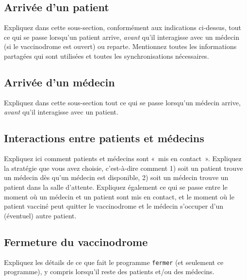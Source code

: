 \documentclass[a4paper]{article}
\makeatletter
\newenvironment{expl}{%
  \begin{list}{}{%
      \small\itshape%
      \topsep\z@%
      \listparindent0pt%
      \parsep0.75\baselineskip%
      \setlength{\leftmargin}{20mm}%
      \setlength{\rightmargin}{20mm}%
    }
  \item[]}%
  {\end{list}}
\makeatother
\begin{document}
\subsection{Arrivée d'un patient}\label{arrivee-patient}

\begin{expl}
  Expliquez dans cette sous-section, conformément aux indications
  ci-dessus, tout ce qui se passe lorsqu'un patient arrive,
  \emph{avant} qu'il interagisse avec un médecin (si le vaccinodrome
  est ouvert) ou reparte. Mentionnez toutes les informations
  partagées qui sont utilisées et toutes les synchronisations
  nécessaires.
\end{expl}

\subsection{Arrivée d'un médecin}

\begin{expl}
  Expliquez dans cette sous-section tout ce qui se passe lorsqu'un
  médecin arrive, \emph{avant} qu'il interagisse avec un patient.
\end{expl}

\subsection{Interactions entre patients et médecins}

\begin{expl}
  Expliquez ici comment patients et médecins sont «~mis en contact~».
  Expliquez la stratégie que vous avez choisie, c'est-à-dire comment
  1) soit un patient trouve un médecin dès qu'un médecin est
  disponible, 2) soit un médecin trouve un patient dans la salle
  d'attente. Expliquez également ce qui se passe entre le moment où un
  médecin et un patient sont mis en contact, et le moment où le
  patient vacciné peut quitter le vaccinodrome et le médecin s'occuper
  d'un (éventuel) autre patient.
\end{expl}

\subsection{Fermeture du vaccinodrome}

\begin{expl}
  Expliquez les détails de ce que fait le programme \texttt{fermer}
  (et seulement ce programme), y compris lorsqu'il reste des patients
  et/ou des médecins.
\end{expl}
\end{document}
